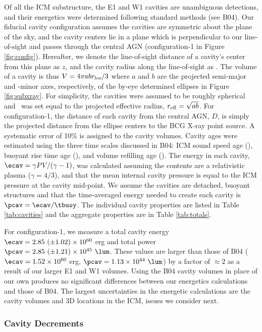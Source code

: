 \documentclass[iop]{emulateapj}
\begin{document}
Of all the ICM substructure, the E1 and W1 cavities are unambiguous
detections, and their energetics were determined following standard
methods (see B04). Our fiducial cavity configuration assumes the
cavities are symmetric about the plane of the sky, and the cavity
centers lie in a plane which is perpendicular to our line-of-sight and
passes through the central AGN (configuration-1 in Figure
\ref{fig:config}). Hereafter, we denote the line-of-sight distance of
a cavity's center from this plane as $z$, and the cavity radius along
the line-of-sight as \rlos. The volume of a cavity is thus $V = 4\pi a
b r_{\rm{los}}/3$ where $a$ and $b$ are the projected semi-major and -minor
axes, respectively, of the by-eye determined ellipses in Figure
\ref{fig:subxray}. For simplicity, the cavities were assumed to be
roughly spherical and \rlos\ was set equal to the projected effective
radius, $r_{\rm{eff}} = \sqrt{ab}$. For configuration-1, the distance of each
cavity from the central AGN, $D$, is simply the projected distance
from the ellipse centers to the BCG X-ray point source. A systematic
error of 10\% is assigned to the cavity volumes. Cavity ages were
estimated using the three time scales discussed in B04: ICM sound
speed age (\tsonic), buoyant rise time age (\tbuoy), and volume
refilling age (\trefill). The energy in each cavity, $\ecav = \gamma
PV/(\gamma-1)$, was calculated assuming the contents are a
relativistic plasma ($\gamma = 4/3$), and that the mean internal
cavity pressure is equal to the ICM pressure at the cavity
mid-point. We assume the cavities are detached, buoyant structures and
that the time-averaged energy needed to create each cavity is $\pcav =
\ecav/\tbuoy$. The individual cavity properties are listed in Table
\ref{tab:cavities} and the aggregate properties are in Table
\ref{tab:totals}.

For configuration-1, we measure a total cavity energy $\ecav = 2.85
~(\pm 1.02) \times 10^{60}$ erg and total power $\pcav = 2.85 ~(\pm
1.21) \times 10^{45} ~\lum$. These values are larger than those of B04
($\ecav = 1.52 \times 10^{60}$ erg, $\pcav = 1.13 \times 10^{44}
~\lum$) by a factor of $\approx 2$ as a result of our larger E1 and W1
volumes. Using the B04 cavity volumes in place of our own produces no
significant differences between our energetics calculations and those
of B04. The largest uncertainties in the energetic calculations are
the cavity volumes and 3D locations in the ICM, issues we consider
next.

\subsubsection{Cavity Decrements}
\label{sec:dec}
\end{document}
